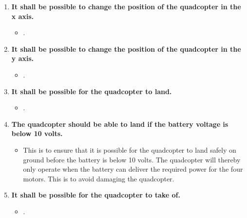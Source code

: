 \begin{enumerate}[label=\textbf{\arabic*})]

\item \textbf{It shall be possible to change the position of the quadcopter in the x axis.}
\begin{itemize}
\item[] .
\end{itemize}


\item \textbf{It shall be possible to change the position of the quadcopter in the y axis.}
\begin{itemize}
\item[] .
\end{itemize}




\item \textbf{It shall be possible for the quadcopter to land.}
\begin{itemize}
\item[] .
\end{itemize}

\item \textbf{The quadcopter should be able to land if the battery voltage is below 10 volts.}
\begin{itemize}
\item[] This is to ensure that it is possible for the quadcopter to land safely on ground before the battery is below 10 volts. The quadcopter will thereby only operate when the battery can deliver the required power for the four motors. This is to avoid damaging the quadcopter.
\end{itemize}


\item \textbf{It shall be possible for the quadcopter to take of.}
\begin{itemize}
\item[] .
\end{itemize}
\end{enumerate}

